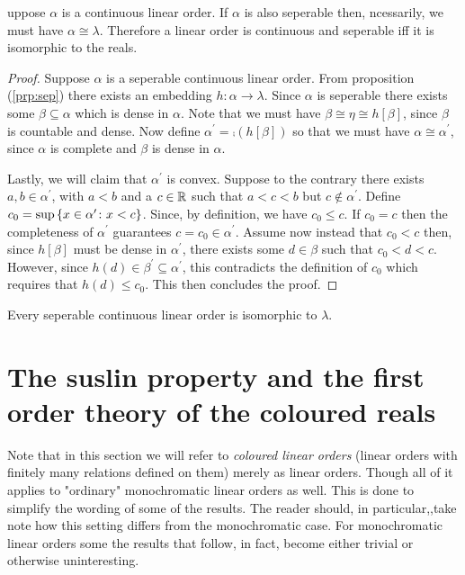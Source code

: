 \begin{thm}
	uppose $\alpha$ is a continuous linear order.  If $\alpha$ is also seperable then, ncessarily, we must have $\alpha\cong\lambda$.  Therefore a linear order is continuous and seperable iff it is isomorphic to the reals.
\end{thm}
\begin{proof}
	Suppose $\alpha$ is a seperable continuous linear order.  From proposition (\ref{prp:sep}) there exists an embedding $h\colon\alpha\to\lambda$.  Since $\alpha$ is seperable there exists some $\beta\subseteq\alpha$ which is dense in $\alpha$.  Note that we must have $\beta\cong\eta\cong h[\beta]$, since $\beta$ is countable and dense.  Now define $\alpha^\prime=\comp(h[\beta])$ so that we must have $\alpha\cong\alpha^\prime$, since $\alpha$ is complete and $\beta$ is dense in $\alpha$.

	Lastly, we will claim that $\alpha^\prime$ is convex.  Suppose to the contrary there exists $a,b\in\alpha^\prime$, with $a<b$ and a $c\in\mathbb{R}$ such that $a<c<b$ but $c\notin\alpha^\prime$.  Define $c_0=\sup\left\lbrace x\in\alpha^\prime\colon x<c \right\rbrace$. Since, by definition, we have $c_0\leq c$.  If $c_0=c$ then the completeness of $\alpha^\prime$ guarantees $c=c_0\in\alpha^\prime$.  Assume now instead that $c_0<c$ then, since $h[\beta]$ must be dense in $\alpha^\prime$, there exists some $d\in\beta$ such that $c_0<d<c$.  However, since $h(d)\in\beta^\prime\subseteq\alpha^\prime$, this contradicts the definition of $c_0$ which requires that $h(d)\leq c_0$.  This then concludes the proof.
\end{proof}

\begin{thm}\label{thm:rchar}
	Every seperable continuous linear order is isomorphic to $\lambda$.
\end{thm}


\section{The  suslin property and the first order theory of the coloured reals}

Note that in this section we will refer to \textit{coloured linear orders} (linear orders with finitely many relations defined on them) merely as linear orders.  Though all of it applies to "ordinary" monochromatic linear orders as well.  This is done to simplify the wording of some of the results.  The reader should, in particular,,take note how this setting differs from the monochromatic case.  For monochromatic linear orders some the results that follow, in fact, become either trivial or otherwise uninteresting.

